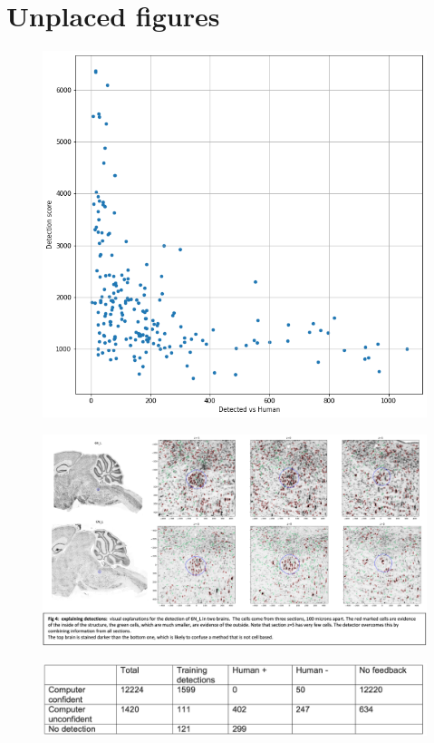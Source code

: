 \documentclass[runningheads]{llncs}
\begin{document}
\section{Unplaced figures}

\begin{figure}[t]
  \includegraphics[width=\textwidth]{figures/DetectionConfidenceVsError.png}
  \caption{}
\end{figure}

\begin{figure}[t]
  \includegraphics[width=\textwidth]{figures/DetectionsExplanations.png}
  \caption{}
\end{figure}

\begin{figure}[t]
  \includegraphics[width=\textwidth]{figures/MarkedCellsDetectionNumbers.png}
  \caption{}
\end{figure}
\end{document}
